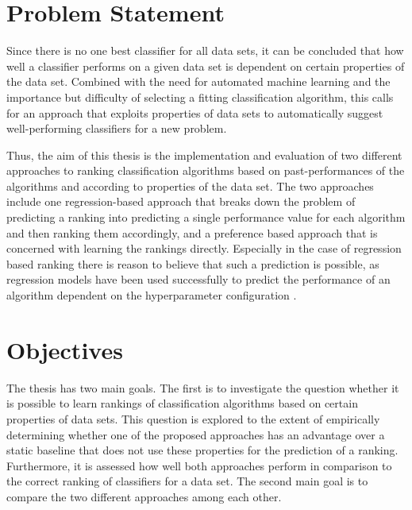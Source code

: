 \section{Problem Statement}
\label{sec:intro:problem}
Since there is no one best classifier for all data sets, it can be concluded that how well a classifier performs on a given data set is dependent on certain properties of the data set. Combined with the need for automated machine learning and the importance but difficulty of selecting a fitting classification algorithm, this calls for an approach that exploits properties of data sets to automatically suggest well-performing classifiers for a new problem.

Thus, the aim of this thesis is the implementation and evaluation of two different approaches to ranking classification algorithms based on past-performances of the algorithms and according to properties of the data set. The two approaches include one regression-based approach that breaks down the problem of predicting a ranking into predicting a single performance value for each algorithm and then ranking them accordingly, and a preference based approach that is concerned with learning the rankings directly. Especially in the case of regression based ranking there is reason to believe that such a prediction is possible, as regression models have been used successfully to predict the performance of an algorithm dependent on the hyperparameter configuration \cite{DBLP:conf/aaai/EggenspergerHHL15}.

\section{Objectives}
\label{sec:intro:objectives}

The thesis has two main goals. The first is to investigate the question whether it is possible to learn rankings of classification algorithms based on certain properties of data sets. This question is explored to the extent of empirically determining whether one of the proposed approaches has an advantage over a static baseline that does not use these properties for the prediction of a ranking. Furthermore, it is assessed how well both approaches perform in comparison to the correct ranking of classifiers for a data set. The second main goal is to compare the two different approaches among each other.

